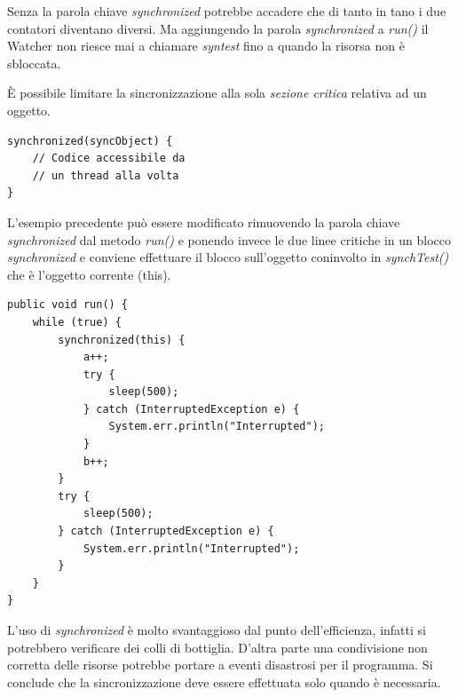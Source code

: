 \documentclass[12pt]{report}
\begin{document}
Senza la parola chiave \textit{synchronized} potrebbe accadere che di tanto in tano i due contatori diventano diversi. Ma aggiungendo la parola \textit{synchronized} a \textit{run()} il Watcher non riesce mai a chiamare \textit{syntest} fino a quando la risorsa non è sbloccata.

È possibile limitare la sincronizzazione alla sola \textit{sezione critica} relativa ad un oggetto.
\begin{lstlisting}[style=javastyle]
synchronized(syncObject) {
	// Codice accessibile da
	// un thread alla volta
}
\end{lstlisting}
L'esempio precedente può essere modificato rimuovendo la parola chiave \textit{synchronized} dal metodo \textit{run()} e ponendo invece le due linee critiche in un blocco \textit{synchronized} e conviene effettuare il blocco sull'oggetto coninvolto in \textit{synchTest()} che è l'oggetto corrente (this).
\begin{lstlisting}[style=javastyle]
public void run() {
	while (true) {
		synchronized(this) {
			a++;
			try {
				sleep(500);
			} catch (InterruptedException e) {
				System.err.println("Interrupted");
			}
			b++;
		}
		try {
			sleep(500);
		} catch (InterruptedException e) {
			System.err.println("Interrupted");
		}
	}
}
\end{lstlisting}
L'uso di \textit{synchronized} è molto svantaggioso dal punto dell'efficienza, infatti si potrebbero verificare dei colli di bottiglia. D'altra parte una condivisione non corretta delle risorse potrebbe portare a eventi disastrosi per il programma. Si conclude che la sincronizzazione deve essere effettuata solo quando è necessaria.
\end{document}
